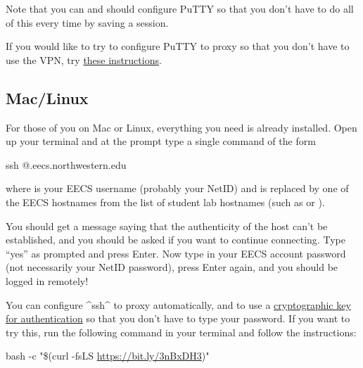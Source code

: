 \documentclass{tufte-handout}
\def\PuTTYhelpUrl{https://nu-cs211.github.io/cs211-files/putty_setup_guide.pdf}
\def\setupScriptUrl{https://bit.ly/3nBxDH3}
\def\setupScriptLink{\href{\setupScriptUrl}{\setupScriptUrl}}
\begin{document}
Note that you can and should configure PuTTY so that you don't have to do all
of this every time by saving a session.

If you would like to try to configure PuTTY to proxy so that
you don’t have to use the VPN, try \href{\PuTTYhelpUrl}{these
instructions}.

\subsection{Mac/Linux}

For those of you on Mac or Linux, everything you need is already
installed. Open up your terminal and at the prompt
type a single command of the form

\begin{CmdLine*}
  \C ssh @.eecs.northwestern.edu\\
\end{CmdLine*}

\noindent where  is your EECS username (probably your NetID)
and  is replaced by one of the EECS hostnames from the list
of student lab hostnames%
(such as  or
).

You should get a message saying that the authenticity of the host
can't be established, and you should be asked if you want to continue
connecting.  Type ``yes'' as prompted and press Enter. Now type in your
EECS account password (not necessarily your NetID password), press
Enter again, and you should be logged in remotely!

You can configure ^ssh^ to proxy automatically, and to use a
\href{https://en.wikipedia.org/wiki/Key_authentication}{cryptographic
key for authentication} so that you don’t have to type your password. If
you want to try this, run the following command in your terminal and
follow the instructions:

\begin{CmdLine*}
  \C bash -c "\$(curl -fsLS \setupScriptLink)"\\
\end{CmdLine*}
\end{document}
